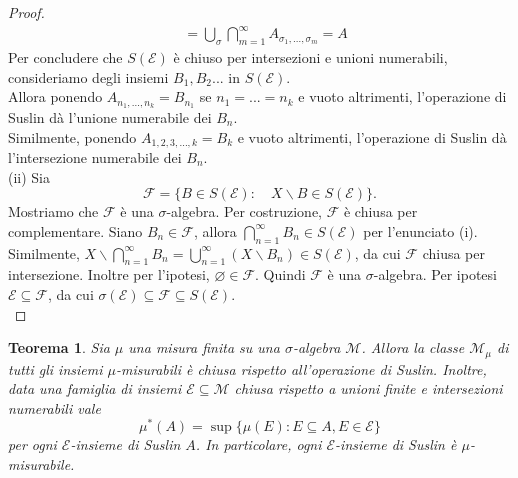 \documentclass[a4paper, twoside,openright]{article}
\newcommand{\<}{\langle}
\renewcommand{\>}{\rangle}
\newtheorem{teo}{Teorema}[]
\begin{document}
\begin{proof}
$$\begin{aligned}
		&=\bigcup_{\sigma} \bigcap_{m=1}^{\infty} A_{\sigma_{1}, \ldots, \sigma_{m}}=A
	\end{aligned}
	$$
	Per concludere che $S(\mathcal{E})$ è chiuso per intersezioni e unioni numerabili, consideriamo degli insiemi $B_1, B_2...$ in $S(\mathcal{E})$.\\
	Allora ponendo $A_{n_1,...,n_k}=B_{n_1}$ se $n_1=...=n_k$ e vuoto altrimenti, l'operazione di Suslin dà l'unione numerabile dei $B_n$.\\
	Similmente, ponendo $A_{1,2,3,...,k}=B_{k}$ e vuoto altrimenti,  l'operazione di Suslin dà l'intersezione numerabile dei $B_n$.\\
	(ii) Sia
	$$
	\mathcal{F}=\{B \in S(\mathcal{E}): \quad X \backslash B \in S(\mathcal{E})\} .
	$$
	Mostriamo che $\mathcal{F}$ è una $\sigma$-algebra. Per costruzione, $\mathcal{F}$ è chiusa per complementare. Siano $B_{n} \in \mathcal{F}$, allora $\bigcap_{n=1}^{\infty} B_{n} \in S(\mathcal{E})$ per l'enunciato (i). Similmente, $X \backslash \bigcap_{n=1}^{\infty} B_{n}=\bigcup_{n=1}^{\infty}\left(X \backslash B_{n}\right) \in S(\mathcal{E})$, da cui $\mathcal{F}$ chiusa per intersezione. Inoltre per l'ipotesi, $\varnothing \in \mathcal{F}$. Quindi $\mathcal{F}$ è una $\sigma$-algebra. Per ipotesi $\mathcal{E} \subseteq \mathcal{F}$, da cui $\sigma(\mathcal{E}) \subseteq \mathcal{F} \subseteq S(\mathcal{E})$.\\
\end{proof}



\begin{teo} \label{misurab}
	Sia $\mu$ una misura finita su una $\sigma$-algebra $\mathcal{M}$. Allora la classe $\mathcal{M}_{\mu}$ di tutti gli insiemi $\mu$-misurabili è chiusa rispetto all'operazione di Suslin. Inoltre, data una famiglia di insiemi $\mathcal{E} \subseteq \mathcal{M}$ chiusa rispetto a unioni finite e intersezioni numerabili vale
	$$
	\mu^{*}(A)=\sup \{\mu(E): E \subseteq A, E \in \mathcal{E}\}
	$$
	per ogni $\mathcal{E}$-insieme di Suslin $A$. In particolare, ogni $\mathcal{E}$-insieme di Suslin è $\mu$-misurabile.
\end{teo}
\end{document}
